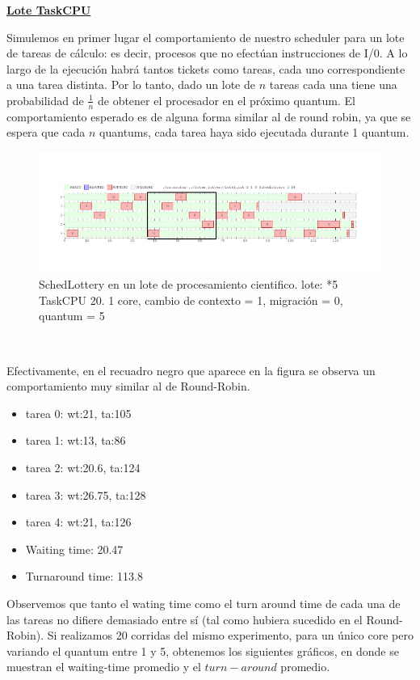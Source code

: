 \textbf{\underline{Lote TaskCPU}}

Simulemos en primer lugar el comportamiento de nuestro scheduler para un lote de tareas de cálculo: es decir, procesos que no 
efectúan instrucciones de I/0. A lo largo de la ejecución habrá tantos tickets como tareas, cada uno correspondiente a una
tarea distinta. Por lo tanto, dado un lote de $n$ tareas cada una tiene una probabilidad de $\frac{1}{n}$ de obtener el procesador
en el próximo quantum. El comportamiento esperado es de alguna forma similar al de round robin, ya que se espera que cada $n$
quantums, cada tarea haya sido ejecutada durante 1 quantum.


\begin{figure}[H]
  \centering\includegraphics[scale=0.5]{graficos/lottery_cpu.jpg}
  \caption{SchedLottery en un lote de procesamiento cientifico. lote: *5 TaskCPU 20.
	1 core, cambio de contexto = 1, migración = 0, quantum = 5}
\end{figure}

~

Efectivamente, en el recuadro negro que aparece en la figura se observa un comportamiento muy similar al de Round-Robin.

\begin{itemize}
	\item tarea 0: wt:21, ta:105
	\item tarea 1: wt:13, ta:86
	\item tarea 2: wt:20.6, ta:124
	\item tarea 3: wt:26.75, ta:128
	\item tarea 4: wt:21, ta:126
	\item  Waiting time: 20.47
	\item  Turnaround time: 113.8
\end{itemize}


Observemos que tanto el wating time como el turn around time de cada una de las tareas no difiere demasiado entre sí (tal como hubiera sucedido en el Round-Robin).
Si realizamos 20 corridas del mismo experimento, para un único core pero variando el quantum entre 1 y 5, obtenemos los siguientes gráficos, en donde se muestran
el waiting-time promedio y el $turn-around$ promedio.


